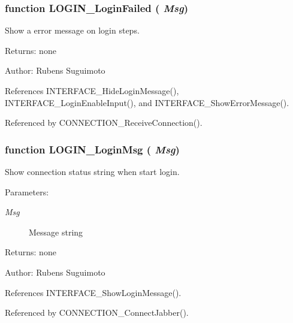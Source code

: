 \subsubsection[LOGIN\_\-LoginFailed]{\setlength{\rightskip}{0pt plus 5cm}function LOGIN\_\-LoginFailed ( {\em Msg})}\label{login_2login_8js_0310d40cf92a026a6f69947e74084569}


Show a error message on login steps. 

\begin{Desc}
\item[Returns:]none \end{Desc}
\begin{Desc}
\item[Author:]Rubens Suguimoto \end{Desc}


References INTERFACE\_\-HideLoginMessage(), INTERFACE\_\-LoginEnableInput(), and INTERFACE\_\-ShowErrorMessage().

Referenced by CONNECTION\_\-ReceiveConnection().
\subsubsection[LOGIN\_\-LoginMsg]{\setlength{\rightskip}{0pt plus 5cm}function LOGIN\_\-LoginMsg ( {\em Msg})}\label{login_2login_8js_87c571535c6f93c68dd9329eff4a83fa}


Show connection status string when start login. 

\begin{Desc}
\item[Parameters:]
\begin{description}
\item[{\em Msg}]Message string \end{description}
\end{Desc}
\begin{Desc}
\item[Returns:]none \end{Desc}
\begin{Desc}
\item[Author:]Rubens Suguimoto \end{Desc}


References INTERFACE\_\-ShowLoginMessage().

Referenced by CONNECTION\_\-ConnectJabber().
